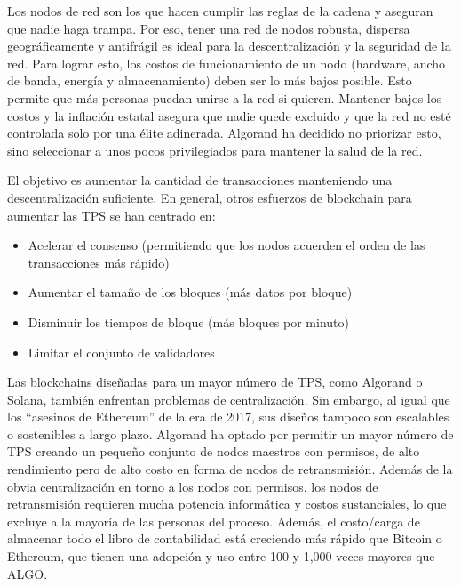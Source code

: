 \documentclass{article}
\begin{document}
Los nodos de red son los que hacen cumplir las reglas de la cadena y aseguran que nadie haga trampa. Por eso, tener una red de nodos robusta, dispersa geográficamente y antifrágil es ideal para la descentralización y la seguridad de la red. Para lograr esto, los costos de funcionamiento de un nodo (hardware, ancho de banda, energía y almacenamiento) deben ser lo más bajos posible. Esto permite que más personas puedan unirse a la red si quieren. Mantener bajos los costos y la inflación estatal asegura que nadie quede excluido y que la red no esté controlada solo por una élite adinerada. Algorand ha decidido no priorizar esto, sino seleccionar a unos pocos privilegiados para mantener la salud de la red.

El objetivo es aumentar la cantidad de transacciones manteniendo una descentralización suficiente. En general, otros esfuerzos de blockchain para aumentar las TPS se han centrado en:

\begin{itemize}
    \item Acelerar el consenso (permitiendo que los nodos acuerden el orden de las transacciones más rápido)
\end{itemize}
\begin{itemize}
    \item Aumentar el tamaño de los bloques (más datos por bloque)
\end{itemize}
\begin{itemize}
    \item Disminuir los tiempos de bloque (más bloques por minuto)
\end{itemize}
\begin{itemize}
    \item Limitar el conjunto de validadores
\end{itemize}

Las blockchains diseñadas para un mayor número de TPS, como Algorand o Solana, también enfrentan problemas de centralización. Sin embargo, al igual que los “asesinos de Ethereum” de la era de 2017, sus diseños tampoco son escalables o sostenibles a largo plazo. Algorand ha optado por permitir un mayor número de TPS creando un pequeño conjunto de nodos maestros con permisos, de alto rendimiento pero de alto costo en forma de nodos de retransmisión. Además de la obvia centralización en torno a los nodos con permisos, los nodos de retransmisión requieren mucha potencia informática y costos sustanciales, lo que excluye a la mayoría de las personas del proceso. Además, el costo/carga de almacenar todo el libro de contabilidad está creciendo más rápido que Bitcoin o Ethereum, que tienen una adopción y uso entre 100 y 1,000 veces mayores que ALGO.
\end{document}
